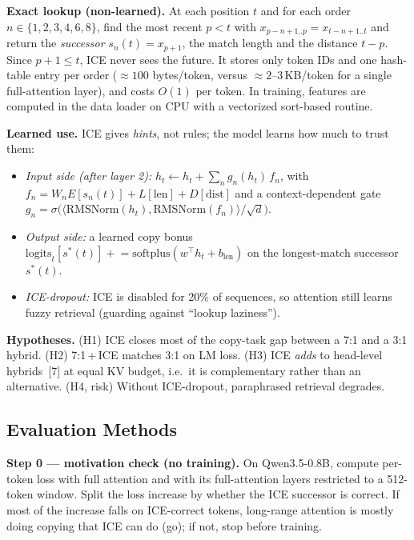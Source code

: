 \documentclass[10pt]{article}
\begin{document}
\textbf{Exact lookup (non-learned).} At each position $t$ and for each order $n\in\{1,2,3,4,6,8\}$, find the most recent $p<t$ with $x_{p-n+1..p}=x_{t-n+1..t}$ and return the \emph{successor} $s_n(t)=x_{p+1}$, the match length and the distance $t-p$. Since $p+1\le t$, ICE never sees the future. It stores only token IDs and one hash-table entry per order (${\approx}100$ bytes/token, versus ${\approx}2$--$3$\,KB/token for a single full-attention layer), and costs $O(1)$ per token. In training, features are computed in the data loader on CPU with a vectorized sort-based routine.

\textbf{Learned use.} ICE gives \emph{hints}, not rules; the model learns how much to trust them:
\begin{itemize}
  \item \emph{Input side (after layer 2):} $h_t \leftarrow h_t + \sum_n g_n(h_t)\, f_n$, with $f_n = W_n E[s_n(t)] + L[\text{len}] + D[\text{dist}]$ and a context-dependent gate $g_n=\sigma\!\big(\langle \mathrm{RMSNorm}(h_t),\mathrm{RMSNorm}(f_n)\rangle/\sqrt d\big)$.
  \item \emph{Output side:} a learned copy bonus $\mathrm{logits}_t[s^*(t)] \mathrel{+}= \mathrm{softplus}(w^\top h_t + b_{\text{len}})$ on the longest-match successor $s^*(t)$.
  \item \emph{ICE-dropout:} ICE is disabled for 20\% of sequences, so attention still learns fuzzy retrieval (guarding against ``lookup laziness'').
\end{itemize}

\textbf{Hypotheses.} (H1) ICE closes most of the copy-task gap between a 7:1 and a 3:1 hybrid. (H2) 7:1\,+\,ICE matches 3:1 on LM loss. (H3) ICE \emph{adds} to head-level hybrids~[7] at equal KV budget, i.e.\ it is complementary rather than an alternative. (H4, risk) Without ICE-dropout, paraphrased retrieval degrades.

\subsection{Evaluation Methods}

\textbf{Step 0 --- motivation check (no training).} On Qwen3.5-0.8B, compute per-token loss with full attention and with its full-attention layers restricted to a 512-token window. Split the loss increase by whether the ICE successor is correct. If most of the increase falls on ICE-correct tokens, long-range attention is mostly doing copying that ICE can do (go); if not, stop before training.
\end{document}
